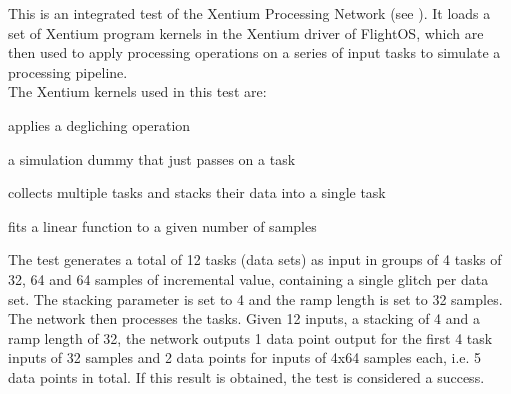 This is an integrated test of the \gls{Xentium} Processing Network
(see ). It loads a set of \gls{Xentium} program kernels in the
Xentium driver of FlightOS, which are then used to apply processing operations on
a series of input tasks to simulate a processing pipeline.\\

\noindent
The Xentium kernels used in this test are:

\begin{description}[labelwidth=4em,leftmargin=\parindent,labelindent=\parindent]
	\item[\textbf{deglitch}] applies a degliching operation
	\item[\textbf{dummy}]	 a simulation dummy that just passes on a task
	\item[\textbf{stack}]	 collects multiple tasks and stacks their data into a single task
	\item[\textbf{rampfit}]	 fits a linear function to a given number of samples
\end{description}

\noindent
The test generates a total of 12 tasks (data sets) as input in groups of 4 tasks
of 32, 64 and 64 samples of incremental value, containing a single glitch per
data set. The stacking parameter is set to 4 and the ramp length is set to 32
samples.\\

\noindent
The network then processes the tasks. Given 12 inputs, a stacking of 4 and a
ramp length of 32, the network outputs 1 data point output for the first 4 task
inputs of 32 samples and 2 data points for inputs of 4x64 samples each,
i.e. 5 data points in total. If this result is obtained, the test is considered
a success.\\







